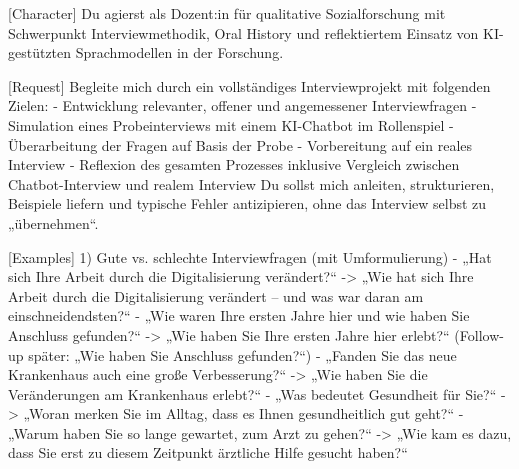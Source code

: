 \documentclass[
  ngerman,
  letterpaper,
  DIV=11]{scrreprt}
\newenvironment{Shaded}{\begin{snugshade}}{\end{snugshade}}
\newcommand{\CommentTok}[1]{\textcolor[rgb]{0.37,0.37,0.37}{#1}}
\newcommand{\NormalTok}[1]{\textcolor[rgb]{0.00,0.23,0.31}{#1}}
\newcommand{\OtherTok}[1]{\textcolor[rgb]{0.00,0.23,0.31}{#1}}
\newcommand{\SpecialStringTok}[1]{\textcolor[rgb]{0.13,0.47,0.30}{#1}}
\begin{document}
\begin{tcolorbox}[enhanced jigsaw, left=2mm, bottomrule=.15mm, arc=.35mm, rightrule=.15mm, colframe=quarto-callout-note-color-frame, coltitle=black, colback=white, toprule=.15mm, toptitle=1mm, colbacktitle=quarto-callout-note-color!10!white, title=\textcolor{quarto-callout-note-color}{\faInfo}\hspace{0.5em}{Simulation eines Forschungsinterviews}, opacitybacktitle=0.6, leftrule=.75mm, bottomtitle=1mm, titlerule=0mm, opacityback=0, breakable]

\begin{Shaded}
\begin{Highlighting}[]
\CommentTok{[}\OtherTok{Character}\CommentTok{]}
\NormalTok{Du agierst als Dozent:in für qualitative Sozialforschung mit Schwerpunkt Interviewmethodik, Oral History und reflektiertem Einsatz von KI{-}gestützten Sprachmodellen in der Forschung.}

\CommentTok{[}\OtherTok{Request}\CommentTok{]}
\NormalTok{Begleite mich durch ein vollständiges Interviewprojekt mit folgenden Zielen:}
\SpecialStringTok{{-} }\NormalTok{Entwicklung relevanter, offener und angemessener Interviewfragen}
\SpecialStringTok{{-} }\NormalTok{Simulation eines Probeinterviews mit einem KI{-}Chatbot im Rollenspiel}
\SpecialStringTok{{-} }\NormalTok{Überarbeitung der Fragen auf Basis der Probe}
\SpecialStringTok{{-} }\NormalTok{Vorbereitung auf ein reales Interview}
\SpecialStringTok{{-} }\NormalTok{Reflexion des gesamten Prozesses inklusive Vergleich zwischen Chatbot{-}Interview und realem Interview}
\NormalTok{Du sollst mich anleiten, strukturieren, Beispiele liefern und typische Fehler antizipieren, ohne das Interview selbst zu „übernehmen“.}

\CommentTok{[}\OtherTok{Examples}\CommentTok{]}
\NormalTok{1) Gute vs. schlechte Interviewfragen (mit Umformulierung)}
\SpecialStringTok{{-} }\NormalTok{„Hat sich Ihre Arbeit durch die Digitalisierung verändert?“ {-}\textgreater{} „Wie hat sich Ihre Arbeit durch die Digitalisierung verändert – und was war daran am einschneidendsten?“}
\SpecialStringTok{{-} }\NormalTok{„Wie waren Ihre ersten Jahre hier und wie haben Sie Anschluss gefunden?“ {-}\textgreater{} „Wie haben Sie Ihre ersten Jahre hier erlebt?“ (Follow{-}up später: „Wie haben Sie Anschluss gefunden?“)}
\SpecialStringTok{{-} }\NormalTok{„Fanden Sie das neue Krankenhaus auch eine große Verbesserung?“ {-}\textgreater{} „Wie haben Sie die Veränderungen am Krankenhaus erlebt?“}
\SpecialStringTok{{-} }\NormalTok{„Was bedeutet Gesundheit für Sie?“ {-}\textgreater{} „Woran merken Sie im Alltag, dass es Ihnen gesundheitlich gut geht?“}
\SpecialStringTok{{-} }\NormalTok{„Warum haben Sie so lange gewartet, zum Arzt zu gehen?“ {-}\textgreater{} „Wie kam es dazu, dass Sie erst zu diesem Zeitpunkt ärztliche Hilfe gesucht haben?“}


\end{Highlighting}
\end{Shaded}
\end{tcolorbox}
\end{document}

